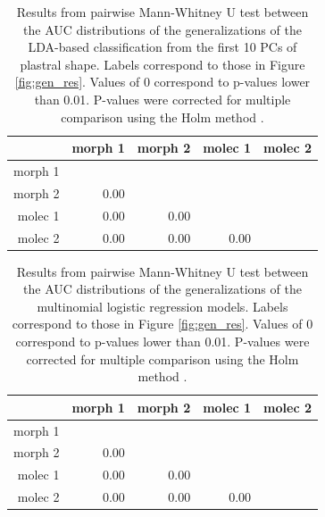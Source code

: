 \documentclass[12pt,letterpaper]{article}\usepackage{graphicx, color}
\begin{document}
\begin{table}
  \centering
\begin{tabular}{r|rrrr}
  & morph 1 & morph 2 & molec 1 & molec 2 \\ 
  \hline
morph 1 &  &  &  &  \\ 
  morph 2 & 0.00 &  &  &  \\ 
  molec 1 & 0.00 & 0.00 &  &  \\ 
  molec 2 & 0.00 & 0.00 & 0.00 &  \\ 
   \hline
\end{tabular}


  \caption{Results from pairwise Mann-Whitney U test between the AUC distributions of the generalizations of the LDA-based classification from the first 10 PCs of plastral shape. Labels correspond to those in Figure \ref{fig:gen_res}. Values of 0 correspond to p-values lower than 0.01. P-values were corrected for multiple comparison using the Holm method \citep{Holm1979}.}
  \label{tab:lda_test}
\end{table}

\begin{table}
  \centering
\begin{tabular}{r|rrrr}
  & morph 1 & morph 2 & molec 1 & molec 2 \\ 
  \hline
morph 1 &  &  &  &  \\ 
  morph 2 & 0.00 &  &  &  \\ 
  molec 1 & 0.00 & 0.00 &  &  \\ 
  molec 2 & 0.00 & 0.00 & 0.00 &  \\ 
   \hline
\end{tabular}


  \caption{Results from pairwise Mann-Whitney U test between the AUC distributions of the generalizations of the multinomial logistic regression models. Labels correspond to those in Figure \ref{fig:gen_res}. Values of 0 correspond to p-values lower than 0.01. P-values were corrected for multiple comparison using the Holm method \citep{Holm1979}.}
  \label{tab:mm_test}
\end{table}
\end{document}
